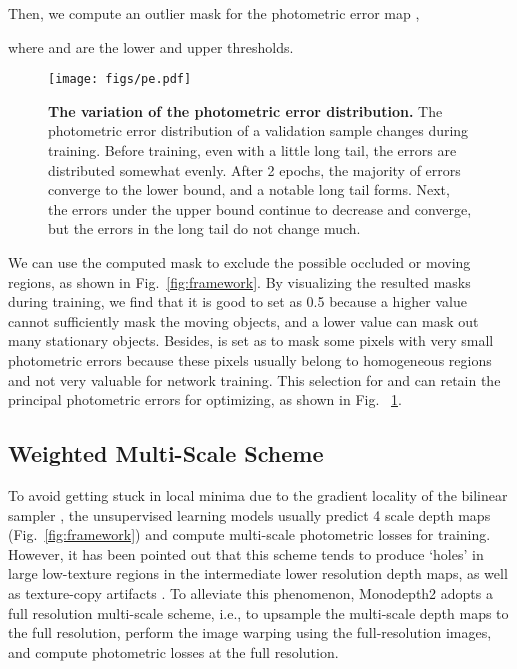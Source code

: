\documentclass[letterpaper, 10 pt, conference]{ieeeconf}
\begin{document}
Then, we compute an outlier mask for the photometric error map , 
 
where  and  are the lower and upper thresholds. 

\begin{figure}[t]
\vspace{6pt}
\begin{center}
\texttt{[image: figs/pe.pdf]}
\end{center}
\vspace{-6pt}
\caption{\textbf{The variation of the photometric error distribution.} The photometric error distribution of a validation sample changes during training.  Before training, even with a little long tail, the errors are distributed somewhat evenly. After 2 epochs, the majority of errors converge to the lower bound, and a notable long tail forms. Next, the errors under the upper bound continue to decrease and converge, but the errors in the long tail do not change much. }
\label{fig:pe}
 \vspace{-8pt}
\end{figure}

We can use the computed mask to exclude the possible occluded or moving regions, as shown in Fig.~\ref{fig:framework}. By visualizing the resulted masks during training, we find that it is good to set  as 0.5 because a higher value cannot sufficiently mask the moving objects, and a lower value can mask out many stationary objects. Besides,  is set as  to mask some pixels with very small photometric errors because these pixels usually belong to homogeneous regions and not very valuable for network training. This selection for  and  can retain the principal photometric errors for optimizing, as shown in Fig. ~\ref{fig:pe}. 


\subsection{Weighted Multi-Scale Scheme}
To avoid getting stuck in local minima due to the gradient locality of the bilinear sampler \cite{jaderberg2015spatial}, the unsupervised learning models usually predict 4 scale depth maps (Fig.~\ref{fig:framework}) and compute multi-scale photometric losses for training. 
However, it has been pointed out that this scheme tends to produce `holes' in large low-texture regions in the intermediate lower resolution depth maps, as well as texture-copy artifacts \cite{godard2019digging}. 
To alleviate this phenomenon, Monodepth2 \cite{godard2019digging} adopts a full resolution multi-scale scheme, i.e., to upsample the multi-scale depth maps to the full resolution, perform the image warping using the full-resolution images, and compute photometric losses at the full resolution. 
\end{document}
